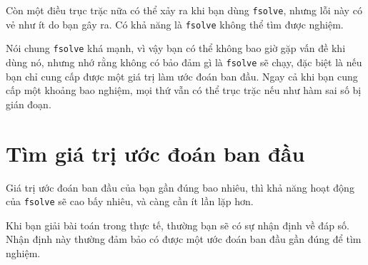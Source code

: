 \documentclass[12pt]{book}
\begin{document}
%
%
%
%
%
%
%

%
%

Còn một điều trục trặc nữa có thể xảy ra khi bạn dùng {\tt fsolve}, nhưng
lỗi này có vẻ như ít do bạn gây ra. Có khả năng là {\tt fsolve} không thể tìm
được nghiệm.

Nói chung {\tt fsolve} khá mạnh, vì vậy bạn có thể không bao giờ gặp
vấn đề khi dùng nó, nhưng nhớ rằng không có bảo đảm gì là {\tt fsolve}
sẽ chạy, đặc biệt là nếu bạn chỉ cung cấp được một giá trị làm ước đoán
ban đầu. Ngay cả khi bạn cung cấp một khoảng bao nghiệm, mọi thứ
vẫn có thể trục trặc nếu như hàm sai số bị gián đoạn.


\section{Tìm giá trị ước đoán ban đầu}

Giá trị ước đoán ban đầu của bạn gần đúng bao nhiêu, thì
khả năng hoạt động của {\tt fsolve} sẽ cao bấy nhiêu, và càng cần ít
lần lặp hơn.

Khi bạn giải bài toán trong thực tế, thường bạn sẽ có sự nhận định
về đáp số. Nhận định này thường đảm bảo có được một ước đoán
ban đầu gần đúng để tìm nghiệm.
\end{document}
